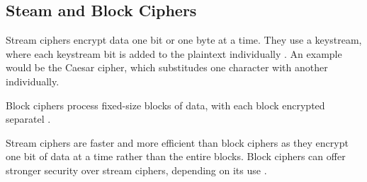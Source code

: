 \subsection{Steam and Block Ciphers}

Stream ciphers encrypt data one bit or one byte at a time.
They use a keystream, where each keystream bit is added to the plaintext individually \cite{Paar2024}.
An example would be the Caesar cipher, which substitudes one character with another individually.

Block ciphers process fixed-size blocks of data, with each block encrypted separatel \cite{Paar2024}.

Stream ciphers are faster and more efficient than block ciphers as they encrypt one bit of data at a time rather than the entire blocks. 
Block ciphers can offer stronger security over stream ciphers, depending on its use \cite{Paar2024}. 